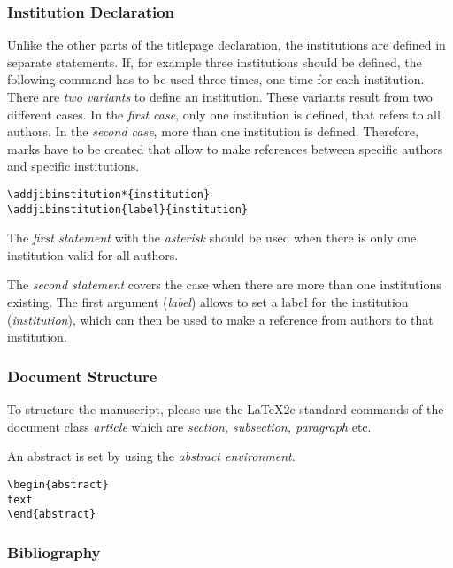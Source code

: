 \documentclass{jib}
\begin{document}
\vspace{15pt}
\subsubsection{Institution Declaration}
\label{sssec_inst_decl}

Unlike the other parts of the titlepage declaration, the institutions are
defined in separate statements. If, for example three institutions should be
defined, the following command has to be used three times, one time for each
institution. There are \emph{two variants} to define an institution. These
variants result from two different cases. In the \emph{first case}, only one
institution is defined, that refers to all authors. In the \emph{second case},
more than one institution is defined. Therefore, marks have to be created that
allow to make references between specific authors and specific institutions.

\begin{lstlisting}[emph={label,institution}]
\addjibinstitution*{institution}
\addjibinstitution{label}{institution}
\end{lstlisting}

The \emph{first statement} with the \emph{asterisk} should be used when there is
only one institution valid for all authors.

The \emph{second statement} covers the case when there are more than one
institutions existing. The first argument (\emph{label}) allows to set a label
for the institution (\emph{institution}), which can then be used to make a
reference from authors to that institution.

\subsubsection{Document Structure}

To structure the manuscript, please use the \LaTeX2e standard commands of the
document class \emph{article} which are \emph{section, subsection, paragraph}
etc.

An abstract is set by using the \emph{abstract environment}.
\begin{lstlisting}[emph={text}]
\begin{abstract}
text
\end{abstract}
\end{lstlisting}

\subsubsection{Bibliography}
\end{document}
